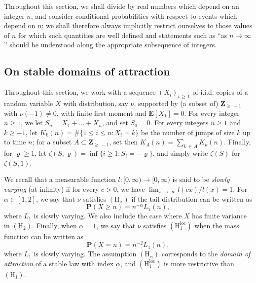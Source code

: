 \documentclass[10pt]{amsart}
\theoremstyle{definition}\newtheorem{defi}[theo]{Definition}\newtheorem{rema}[theo]{Remark}\newtheorem{exam}[theo]{Example}\newtheorem{exem}[theo]{Example}\newtheorem{nota}[theo]{Notation}
\newcommand{\ensembles}[1]{\mathbf{#1}}
\newcommand{\Z}{\ensembles{Z}}
\renewcommand{\P}{\ensembles{P}}
\newcommand{\E}{\ensembles{E}}
\renewcommand{\Pr}[1]{\P\left(#1\right)}
\newcommand{\1}{\ensembles{1}}
\renewcommand{\le}{\leqslant}
\renewcommand{\ge}{\geqslant}
\newcommand{\Hrm}{\mathrm{H}}
\newcommand{\Hrmloc}{\mathrm{(H_1^{loc})}}
\newcommand{\Hrmalp}{\mathrm{(H_\alpha)}}
\providecommand{\?}{}
\begin{document}
Throughout this section, we shall divide by real numbers which depend on an integer $n$, and consider conditional probabilities with respect to events which depend on $n$; we shall therefore always implicitly restrict ourselves to those values of $n$ for which such quantities are well defined and statements such as ``as $n \to \infty$'' should be understood along the appropriate subsequence of integers.


\subsection{On stable domains of attraction}\label{sec:marche_stable}


Throughout this section, we work with a sequence $(X_i)_{i\,\ge\,1}$ of i.i.d. copies of a random variable $X$ with distribution, say $\nu$, supported by (a subset of) $\Z_{\ge\,-1}$ with $\nu(-1) \ne 0$, with finite first moment and $\E[X_1] = 0$. For every integer $n \ge 1$, we let $S_n = X_1 + \dots + X_n$, and set $S_0 = 0$. For every integers $n \ge 1$ and $k \ge -1$, let $K_k(n) = \#\{1 \le i \le n : X_i = k\}$ be the number of jumps of size $k$ up to time $n$; for a subset $A \subset \Z_{\ge\,-1}$, set then $K_A(n) = \sum_{k\,\in\,A} K_k(n)$. Finally, for $\varrho \ge 1$, let $\zeta(S, \varrho) = \inf\{i \ge 1 : S_i = - \varrho\}$, and simply write $\zeta(S)$ for $\zeta(S,1)$.


We recall that a measurable function $l : [0, \infty) \to [0, \infty)$ is said to be \emph{slowly varying} (at infinity) if for every $c > 0$, we have $\lim_{x\,\to\, \infty} l(cx)/l(x) = 1$. For $\alpha \in [1,2]$, we say that $\nu$ satisfies $\Hrmalp$ if the tail distribution can be written as
\[
\Pr{X \ge n} = n^{-\alpha} L_1(n),
\]
where $L_1$ is slowly varying. We also include the case where $X$ has finite variance in $(\Hrm_2)$. Finally, when $\alpha = 1$, we say that $\nu$ satisfies $\Hrmloc$ when the mass function can be written as
\[
\Pr{X = n} = n^{-2} L_1(n),
\]
where $L_1$ is slowly varying. The assumption $\Hrmalp$ corresponds to the \emph{domain of attraction} of a stable law with index $\alpha$, and $\Hrmloc$ is more restrictive than $(\Hrm_1)$.
\end{document}
